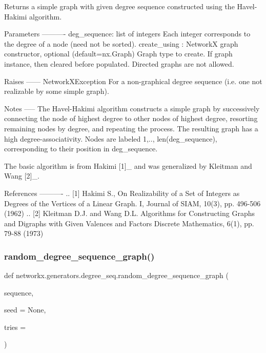 \begin{DoxyVerb}Returns a simple graph with given degree sequence constructed
using the Havel-Hakimi algorithm.

Parameters
----------
deg_sequence: list of integers
    Each integer corresponds to the degree of a node (need not be sorted).
create_using : NetworkX graph constructor, optional (default=nx.Graph)
    Graph type to create. If graph instance, then cleared before populated.
    Directed graphs are not allowed.

Raises
------
NetworkXException
    For a non-graphical degree sequence (i.e. one
    not realizable by some simple graph).

Notes
-----
The Havel-Hakimi algorithm constructs a simple graph by
successively connecting the node of highest degree to other nodes
of highest degree, resorting remaining nodes by degree, and
repeating the process. The resulting graph has a high
degree-associativity.  Nodes are labeled 1,.., len(deg_sequence),
corresponding to their position in deg_sequence.

The basic algorithm is from Hakimi [1]_ and was generalized by
Kleitman and Wang [2]_.

References
----------
.. [1] Hakimi S., On Realizability of a Set of Integers as
   Degrees of the Vertices of a Linear Graph. I,
   Journal of SIAM, 10(3), pp. 496-506 (1962)
.. [2] Kleitman D.J. and Wang D.L.
   Algorithms for Constructing Graphs and Digraphs with Given Valences
   and Factors  Discrete Mathematics, 6(1), pp. 79-88 (1973)
\end{DoxyVerb}
 \mbox{\label{namespacenetworkx_1_1generators_1_1degree__seq_a550339320fb130deb73bf8e594485d7e}} 
\subsubsection{\texorpdfstring{random\+\_\+degree\+\_\+sequence\+\_\+graph()}{random\_degree\_sequence\_graph()}}
{\footnotesize\ttfamily def networkx.\+generators.\+degree\+\_\+seq.\+random\+\_\+degree\+\_\+sequence\+\_\+graph (\begin{DoxyParamCaption}\item[{}]{sequence,  }\item[{}]{seed = {\ttfamily None},  }\item[{}]{tries = {} }\end{DoxyParamCaption})}

